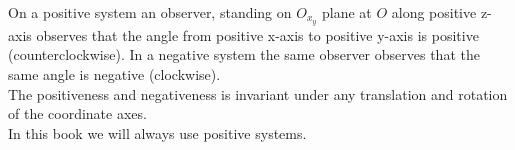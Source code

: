 \documentclass{amsbook}
\begin{document}
    On a positive system an observer, standing on $O_x_y$ plane at $O$ along positive z-axis observes that the angle from positive x-axis to positive y-axis is positive (counterclockwise). In a negative system the same observer observes that the same angle is negative (clockwise).\\
    
    The positiveness and negativeness is invariant under any translation and rotation of the coordinate axes.\\
    
    In this book we will always use positive systems.
    
\end{document}
